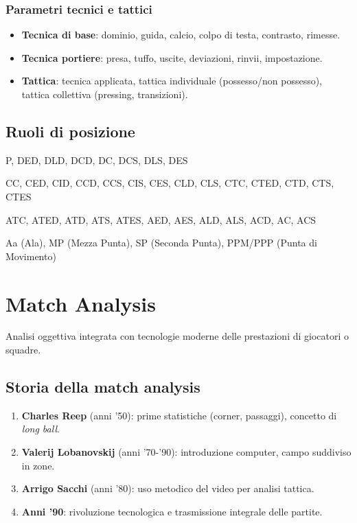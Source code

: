 \documentclass[a4paper,11pt]{article}
\begin{document}
\subsubsection{Parametri tecnici e tattici}
\begin{itemize}
    \item \textbf{Tecnica di base}: dominio, guida, calcio, colpo di testa, contrasto, rimesse.
    \item \textbf{Tecnica portiere}: presa, tuffo, uscite, deviazioni, rinvii, impostazione.
    \item \textbf{Tattica}: tecnica applicata, tattica individuale (possesso/non possesso), tattica collettiva (pressing, transizioni).
\end{itemize}

\subsection{Ruoli di posizione}
\begin{description}[leftmargin=*]
    \item[\textbf{Difensori}] P, DED, DLD, DCD, DC, DCS, DLS, DES
    \item[\textbf{Centrocampisti}] CC, CED, CID, CCD, CCS, CIS, CES, CLD, CLS, CTC, CTED, CTD, CTS, CTES
    \item[\textbf{Attaccanti}] ATC, ATED, ATD, ATS, ATES, AED, AES, ALD, ALS, ACD, AC, ACS
    \item[\textbf{Profili tattici}] Aa (Ala), MP (Mezza Punta), SP (Seconda Punta), PPM/PPP (Punta di Movimento)
\end{description}

\newpage
\section{Match Analysis}
Analisi oggettiva integrata con tecnologie moderne delle prestazioni di giocatori o squadre.

\subsection{Storia della match analysis}
\begin{enumerate}
    \item \textbf{Charles Reep} (anni '50): prime statistiche (corner, passaggi), concetto di \textit{long ball}.
    \item \textbf{Valerij Lobanovskij} (anni '70-'90): introduzione computer, campo suddiviso in zone.
    \item \textbf{Arrigo Sacchi} (anni '80): uso metodico del video per analisi tattica.
    \item \textbf{Anni '90}: rivoluzione tecnologica e trasmissione integrale delle partite.
\end{enumerate}
\end{document}

